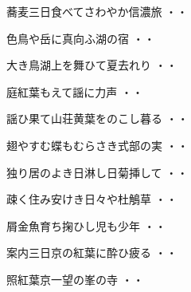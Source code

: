 \begin{shiika}蕎麦三日食べてさわやか信濃旅
\hfill{・・}\end{shiika}
\vspace{0.6cm}
\begin{shiika}色鳥や岳に真向ふ湖の宿
\hfill{・・}\end{shiika}
\vspace{0.6cm}
\begin{shiika}大き鳥湖上を舞ひて夏去れり
\hfill{・・}\end{shiika}
\vspace{0.6cm}
\begin{shiika}庭紅葉もえて謡に力声
\hfill{・・}\end{shiika}
\vspace{0.6cm}
\begin{shiika}謡ひ果て山荘黄葉をのこし暮る
\hfill{・・}\end{shiika}
\vspace{0.6cm}
\begin{shiika}翅やすむ蝶もむらさき式部の実
\hfill{・・}\end{shiika}
\vspace{0.6cm}
\begin{shiika}独り居のよき日淋し日菊挿して
\hfill{・・}\end{shiika}
\vspace{0.6cm}
\begin{shiika}疎く住み安けき日々や杜鵤草
\hfill{・・}\end{shiika}
\vspace{0.6cm}
\begin{shiika}屑金魚育ち掬ひし児も少年
\hfill{・・}\end{shiika}
\vspace{0.6cm}
\begin{shiika}案内三日京の紅葉に酔ひ疲る
\hfill{・・}\end{shiika}
\vspace{0.6cm}
\begin{shiika}照紅葉京一望の峯の寺
\hfill{・・}\end{shiika}
\vspace{0.6cm}
